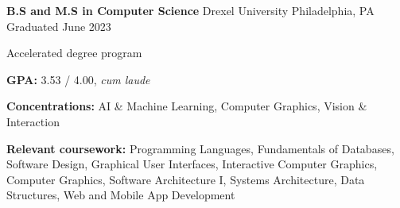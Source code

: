 

\begin{cventries}

  \cventry
  {\textbf{B.S and M.S in Computer Science}} %
  {Drexel University} %
  {Philadelphia, PA} %
  {Graduated June 2023} %
  {
    \begin{cvitems} %
      \item {Accelerated degree program}
      \item {\textbf{GPA:} 3.53 / 4.00, \textit{cum laude}}
      \item {\textbf{Concentrations:} AI \& Machine Learning, Computer Graphics, Vision \& Interaction}
      \item {\color{darktext} \textbf{Relevant coursework:}
        Programming Languages,
        Fundamentals of Databases,
        Software Design,
        Graphical User Interfaces,
        Interactive Computer Graphics,
        Computer Graphics,
        Software Architecture I,
        Systems Architecture,
        Data Structures,
        Web and Mobile App Development
      }
    \end{cvitems}
  } 

\end{cventries}
